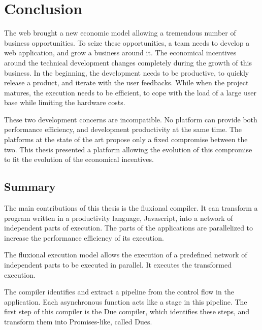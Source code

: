 \chapter{Conclusion} \label{chapter7}
\minitoc
\eject

The web brought a new economic model allowing a tremendous number of business opportunities.
To seize these opportunities, a team needs to develop a web application, and grow a business around it.
The economical incentives around the technical development changes completely during the growth of this business.
In the beginning, the development needs to be productive, to quickly release a product, and iterate with the user feedbacks.
While when the project matures, the execution needs to be efficient, to cope with the load of a large user base while limiting the hardware costs.

These two development concerns are incompatible.
No platform can provide both performance efficiency, and development productivity at the same time.
The platforms at the state of the art propose only a fixed compromise between the two.
This thesis presented a platform allowing the evolution of this compromise to fit the evolution of the economical incentives.

\section{Summary}

The main contributions of this thesis is the fluxional compiler.
It can transform a program written in a productivity language, Javascript, into a network of independent parts of execution.
The parts of the applications are parallelized to increase the performance efficiency of its execution.


The fluxional execution model allows the execution of a predefined network of independent parts to be executed in parallel.
It executes the transformed execution.


The compiler identifies and extract a pipeline from the control flow in the application.
Each asynchronous function acts like a stage in this pipeline.
The first step of this compiler is the Due compiler, which identifies these steps, and transform them into Promises-like, called Dues.

